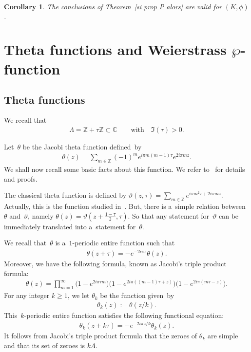 \documentclass[pdftex]{sigma}
\numberwithin{equation}{section}
\newtheorem{Corollary}[Theorem]{Corollary}
\begin{document}
\begin{Corollary}
\label{coro1}
The conclusions of Theorem~{\rm \ref{si prop P alors}} are valid for $(K,\phi)$.
\end{Corollary}

\section[Theta functions and Weierstrass $\wp$-function]{Theta functions and Weierstrass $\boldsymbol{\wp}$-function}
\label{sec3}

\subsection{Theta functions}
\label{sec31}

We recall that
\begin{gather*}
\Lambda=\mathbb Z+\tau \mathbb Z \subset \mathbb C \qquad \text{with} \quad \Im(\tau)>0.
\end{gather*}

Let~$\theta$ be the Jacobi theta function def\/ined~by
\begin{gather*}
\theta(z)=\sum\limits_{m\in \mathbb Z}(-1)^{m} e^{i\pi m(m-1) \tau} e^{2i \pi m z}.
\end{gather*}
We shall now recall some basic facts about this function.
We refer to~\cite[Chapter~I]{Mumford} for details and proofs.



\begin{Remark}
The classical theta function is def\/ined by ${\vartheta(z,\tau) = \sum\limits_{m \in \mathbb Z} e^{i\pi m^{2} \tau+ 2i
\pi m z}}$.
Actually, this is the function studied in~\cite[Chapter~I]{Mumford}.
But, there is a~simple relation between~$\theta$ and~$\vartheta$, namely $\theta(z)=\vartheta(z+\frac{1-\tau}{2},\tau)$.
So that any statement for~$\vartheta$ can be immediately translated into a~statement for~$\theta$.
\end{Remark}

We recall that~$\theta$ is a~$1$-periodic entire function such that
\begin{gather*}
\theta(z+\tau)=- e^{-2i\pi z}\theta(z).
\end{gather*}
Moreover, we have the following formula, known as Jacobi's triple product formula:
\begin{gather*}
\theta(z)= \prod\limits_{m=1}^{\infty}\big(1-e^{2i\pi \tau
m}\big)\big(1-e^{2i\pi((m-1)\tau+z)}\big)\big(1-e^{2i\pi(m\tau-z)}\big).
\end{gather*}
For any integer $k \geq 1$, we let $\theta_{k}$ be the function given~by
\begin{gather*}
\theta_{k}(z):=\theta(z/k).
\end{gather*}
This~$k$-periodic entire function satisf\/ies the following functional equation:
\begin{gather}
\label{func equa theta k}
\theta_{k}(z+k\tau)=- e^{-2i\pi z/k}\theta_{k}(z).
\end{gather}
It follows from Jacobi's triple product formula that the zeroes of $\theta_{k}$ are simple and that its set of zeroes is
$k\Lambda$.
\end{document}
